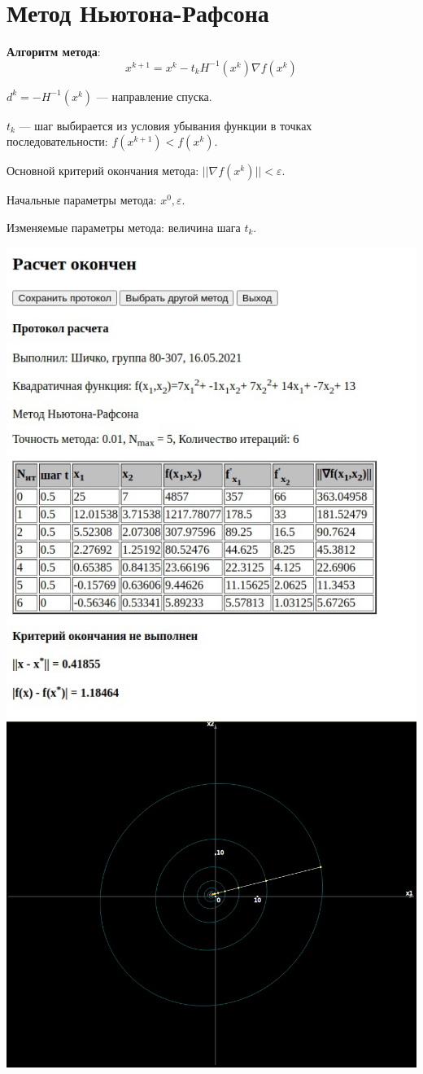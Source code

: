 \section{Метод Ньютона-Рафсона}

\textbf{Алгоритм метода}:
$$ x^{k + 1} = x^{k} - t_{k}H^{-1}(x^{k})\nabla f(x^{k}) $$

$d^{k} = -H^{-1}(x^{k})$ --- направление спуска.

$t_{k}$ --- шаг выбирается из условия убывания функции в точках последовательности: $f(x^{k + 1}) < f(x^{k})$.

Основной критерий окончания метода: $||\nabla f(x^{k})|| < \varepsilon$.

Начальные параметры метода: $x^{0}, \varepsilon$.

Изменяемые параметры метода: величина шага $t_{k}$.

\includegraphics[width=0.8\linewidth]{images/3_prot.jpg}\\
\includegraphics[width=0.8\linewidth]{images/3_image.jpg}\\

